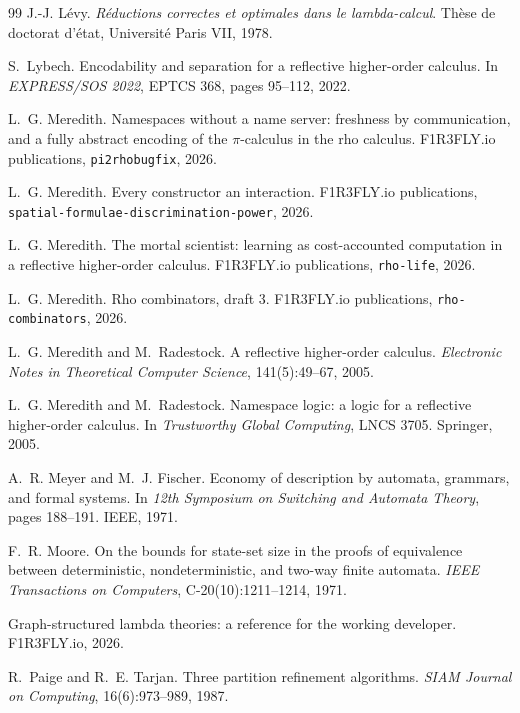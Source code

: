 \documentclass[11pt]{article}
\theoremstyle{definition}
\theoremstyle{plain}
\theoremstyle{remark}
\begin{document}
\begin{thebibliography}{99}
J.-J. L\'evy.
\newblock \emph{R\'eductions correctes et optimales dans le
lambda-calcul}.
\newblock Th\`ese de doctorat d'\'etat, Universit\'e Paris VII, 1978.

S.~Lybech.
\newblock Encodability and separation for a reflective higher-order
calculus.
\newblock In \emph{EXPRESS/SOS 2022}, EPTCS 368, pages 95--112, 2022.

L.~G. Meredith.
\newblock Namespaces without a name server: freshness by communication,
and a fully abstract encoding of the $\pi$-calculus in the rho calculus.
\newblock F1R3FLY.io publications, \texttt{pi2rhobugfix}, 2026.

L.~G. Meredith.
\newblock Every constructor an interaction.
\newblock F1R3FLY.io publications,
\texttt{spatial-formulae-discrimination-power}, 2026.

L.~G. Meredith.
\newblock The mortal scientist: learning as cost-accounted computation in
a reflective higher-order calculus.
\newblock F1R3FLY.io publications, \texttt{rho-life}, 2026.

L.~G. Meredith.
\newblock Rho combinators, draft 3.
\newblock F1R3FLY.io publications, \texttt{rho-combinators}, 2026.

L.~G. Meredith and M.~Radestock.
\newblock A reflective higher-order calculus.
\newblock \emph{Electronic Notes in Theoretical Computer Science},
141(5):49--67, 2005.

L.~G. Meredith and M.~Radestock.
\newblock Namespace logic: a logic for a reflective higher-order calculus.
\newblock In \emph{Trustworthy Global Computing}, LNCS 3705. Springer,
2005.

A.~R. Meyer and M.~J. Fischer.
\newblock Economy of description by automata, grammars, and formal
systems.
\newblock In \emph{12th Symposium on Switching and Automata Theory}, pages
188--191. IEEE, 1971.

F.~R. Moore.
\newblock On the bounds for state-set size in the proofs of equivalence
between deterministic, nondeterministic, and two-way finite automata.
\newblock \emph{IEEE Transactions on Computers}, C-20(10):1211--1214,
1971.

Graph-structured lambda theories: a reference for the working developer.
\newblock F1R3FLY.io, 2026.

R.~Paige and R.~E. Tarjan.
\newblock Three partition refinement algorithms.
\newblock \emph{SIAM Journal on Computing}, 16(6):973--989, 1987.


\end{thebibliography}
\end{document}
